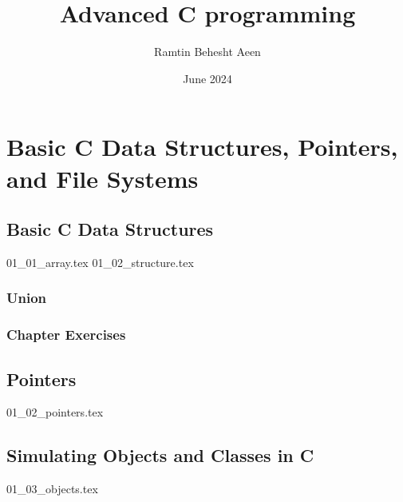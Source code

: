 \documentclass{book}
\title{Advanced C programming}
\author{Ramtin Behesht Aeen}
\date{June 2024}
\begin{document}
\maketitle
\tableofcontents

\part{ Basic C Data Structures, Pointers, and File Systems}
\chapter{Basic C Data Structures}
{01_01_array.tex}
{01_02_structure.tex}
\section{Union}
\section{Chapter Exercises}


\chapter{Pointers}
{01_02_pointers.tex}

\chapter{Simulating Objects and Classes in C}
{01_03_objects.tex}
\end{document}
